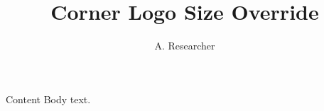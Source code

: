 \documentclass{beamer}
\title{Corner Logo Size Override}
\author{A. Researcher}
\begin{document}
{
\begin{frame}[plain]\titlepage\end{frame}
}
\begin{frame}[fragile]{Content}
Body text.
\ifdim\ndcornerlogowidth<8cm
  \typeout{ND-TEST-FAIL: cornerlogo override did not take effect (width=\the\ndcornerlogowidth, expected > 8cm)}
\else
  \typeout{ND-TEST-OK: cornerlogo width=\the\ndcornerlogowidth}
\fi
\end{frame}
\end{document}
